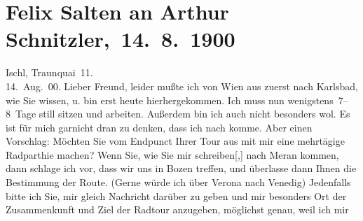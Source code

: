 

         
         \renewcommand{\erwaehntePersonen}{Personen: Oskar Mayer}
         \renewcommand{\erwaehnteOrte}{Orte: Ala, Bad Ischl, Bludenz, Bozen, Innsbruck, Karlsbad, Meran, Schruns, Schweiz, Traunkai, Triest, Venedig, Verona, Wien}
         \renewcommand{\erwaehnteWerke}{}
               \section[ Felix Salten an Arthur Schnitzler, 14. 8. 1900]{ Felix Salten an Arthur Schnitzler, 14. 8. 1900}\nopagebreak{}\rehead{ }\begin{ledgroupsized}[t]{13cm}\normalsize\beginnumbering \toendnotes[C]{\smallbreak\pagebreak[2]} 
\toendnotes[C]{\smallbreak}\pstart
           \raggedleft{}{\pb}Ischl, Traunquai 11. {\\}14. Aug. 00.\pend
           \pstart
           Lieber Freund, leider mußte ich von Wien aus zuerst nach Karlsbad, wie Sie
               wissen, u. bin erst heute hierhergekommen. Ich muss
               nun wenigstens 7–8 Tage still sitzen und arbeiten. Außerdem bin ich auch nicht
               besonders wol. Es ist für mich garnicht dran zu denken, dass ich nach \label{K_L03310-1v}\label{K_L03310-1h} komme. Aber einen Vorschlag: Möchten Sie vom Endpunct Ihrer Tour aus mit mir
               eine mehrtägige Radparthie machen? Wenn Sie, wie Sie mir
                  schreiben{[},{]} nach Meran
               kommen, dann schlage ich vor, dass wir uns in Bozen treffen, und überlasse dann Ihnen die Bestimmung der Route. (Gerne {\pb}würde ich über Verona nach Venedig)
               Jedenfalls bitte ich Sie, mir gleich Nachricht darüber zu geben und mir besonders Ort
               der Zusammenkunft und Ziel der Radtour anzugeben, möglichst genau, weil ich mir

\end{ledgroupsized}
